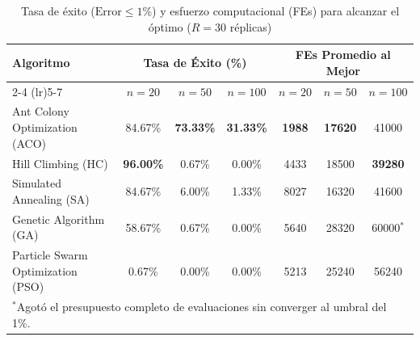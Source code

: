 \documentclass[11pt, a4paper]{article}
\begin{document}
\begin{table}[htbp]
\centering
\caption{Tasa de éxito ($\text{Error} \le 1\%$) y esfuerzo computacional (FEs) para alcanzar el óptimo ($R=30$ réplicas)}
\label{tab:escalabilidad_exito}
\small
\begin{tabular}{lcccccc}
\toprule
\textbf{Algoritmo} & \multicolumn{3}{c}{\textbf{Tasa de Éxito (\%)}} & \multicolumn{3}{c}{\textbf{FEs Promedio al Mejor}} \\
\cmidrule(lr){2-4} \cmidrule(lr){5-7}
& $n=20$ & $n=50$ & $n=100$ & $n=20$ & $n=50$ & $n=100$ \\
\midrule
Ant Colony Optimization (ACO)      & 84.67\% & \textbf{73.33\%} & \textbf{31.33\%} & \textbf{1988}  & \textbf{17620} & 41000 \\
Hill Climbing (HC)                 & \textbf{96.00\%} & 0.67\%  & 0.00\%           & 4433           & 18500          & \textbf{39280} \\
Simulated Annealing (SA)           & 84.67\% & 6.00\%           & 1.33\%           & 8027           & 16320          & 41600 \\
Genetic Algorithm (GA)             & 58.67\% & 0.67\%           & 0.00\%           & 5640           & 28320          & 60000$^*$ \\
Particle Swarm Optimization (PSO)  & 0.67\%  & 0.00\%           & 0.00\%           & 5213           & 25240          & 56240 \\
\bottomrule
\multicolumn{7}{l}{\footnotesize $^*$Agotó el presupuesto completo de evaluaciones sin converger al umbral del 1\%.}
\end{tabular}
\end{table}
\end{document}
